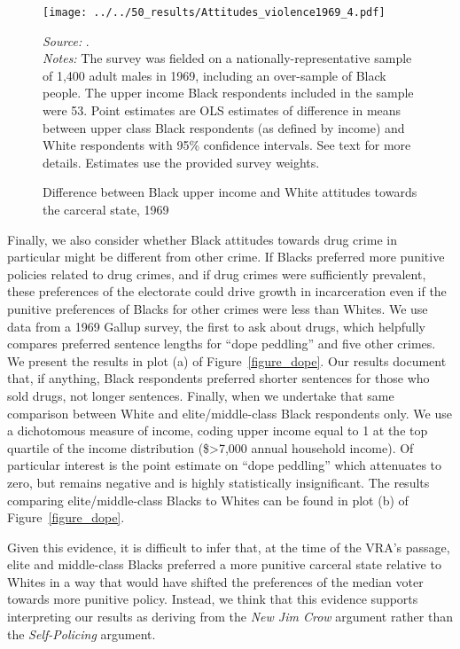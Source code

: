\documentclass[12pt]{article}
\begin{document}
\begin{figure}[h!]
 \begin{center}
 \caption{Difference between Black upper income and White attitudes towards the carceral state, 1969}
 \small
		 \texttt{[image: ../../50\_results/Attitudes\_violence1969\_4.pdf]}
 \label{figure_attitudes_class2}
 	\end{center}
 	{\scriptsize{\emph{Source:} . }} \\
	{\scriptsize{\emph{Notes:} The survey was fielded on a nationally-representative sample of 1,400 adult males in 1969, including an over-sample of Black people.  The upper income Black respondents included in the sample were 53.   Point estimates are OLS estimates of difference in means between upper class Black respondents (as defined by income) and White respondents with 95\% confidence intervals.  See text for more details.  Estimates use the provided survey weights.  \singlespacing }}
\end{figure} \normalsize


Finally, we also consider whether Black attitudes towards drug crime in particular might be different from other crime.  If Blacks preferred more punitive policies related to drug crimes, and if drug crimes were sufficiently prevalent, these preferences of the electorate could drive growth in incarceration even if the punitive preferences of Blacks for other crimes were less than Whites.  We use data from a 1969 Gallup survey, the first to ask about drugs, which helpfully compares preferred sentence lengths for ``dope peddling'' and five other crimes.  We present the results in plot (a) of Figure~\ref{figure_dope}. Our results document that, if anything, Black respondents preferred shorter sentences for those who sold drugs, not longer sentences.  Finally, when we undertake that same comparison between White and elite/middle-class Black respondents only.  We use a dichotomous measure of income, coding upper income equal to 1 at the top quartile of the income distribution (\$>7,000 annual household income).  Of particular interest is the point estimate on ``dope peddling'' which attenuates to zero, but remains negative and is highly statistically insignificant.  The results comparing elite/middle-class Blacks to Whites can be found in plot (b) of Figure~\ref{figure_dope}.

Given this evidence, it is difficult to infer that, at the time of the VRA's passage, elite and middle-class Blacks preferred a more punitive carceral state relative to Whites in a way that would have shifted the preferences of the median voter towards more punitive policy.  Instead, we think that this evidence supports interpreting our results as deriving from the \emph{New Jim Crow} argument rather than the \emph{Self-Policing} argument.
\end{document}
